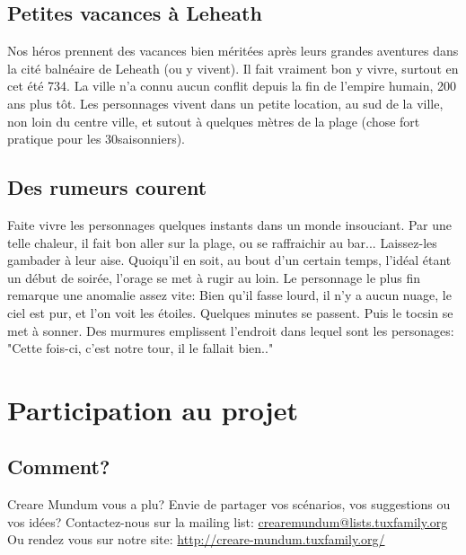 \documentclass[a4paper]{article}
\begin{document}
\subsection{Petites vacances à Leheath}
Nos héros prennent des vacances bien méritées après leurs grandes aventures dans la cité balnéaire de Leheath (ou y vivent). 
Il fait vraiment bon y vivre, surtout en cet été 734. La ville n'a connu aucun conflit depuis la fin de l'empire humain, 200 ans plus tôt.
\newline
Les personnages vivent dans un petite location, au sud de la ville, non loin du centre ville, et sutout à quelques mètres de la plage (chose fort pratique pour les 30\degre saisonniers).
\subsection{Des rumeurs courent}
Faite vivre les personnages quelques instants dans un monde insouciant. Par une telle chaleur, il fait bon aller sur la plage, ou se raffraichir au bar... Laissez-les gambader à leur aise. Quoiqu'il en soit, au bout d'un certain temps, l'idéal étant un début de soirée, l'orage se met à rugir au loin. 
\newline
Le personnage le plus fin remarque une anomalie assez vite: Bien qu'il fasse lourd, il n'y a aucun nuage, le ciel est pur, et l'on voit les étoiles. Quelques minutes se passent. Puis le tocsin se met à sonner. Des murmures emplissent l'endroit dans lequel sont les personages:
\newline
"Cette fois-ci, c'est notre tour, il le fallait bien.."


\newpage
\section{Participation au projet}
\subsection{Comment?}
\hypertarget{participation}{}
Creare Mundum vous a plu? 
Envie de partager vos scénarios, vos suggestions ou vos idées?
\newline
Contactez-nous sur la mailing list: \href {mailto:crearemundum@lists.tuxfamily.org}{crearemundum@lists.tuxfamily.org}
\newline
Ou rendez vous sur notre site: \href {http://creare-mundum.tuxfamily.org/} {http://creare-mundum.tuxfamily.org/}
\end{document}
